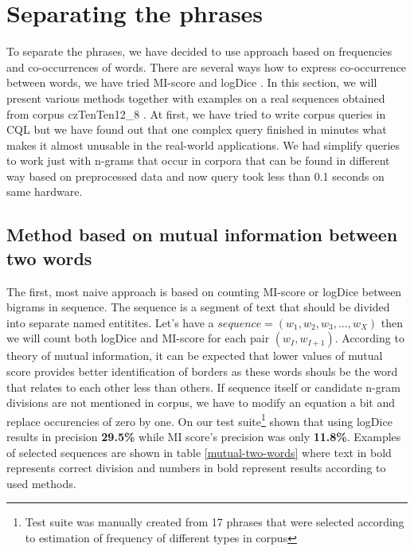 \documentclass[runningheads]{llncs}
\begin{document}
\section{Separating the phrases}

To separate the phrases, we have decided to use approach based on
frequencies and co-occurrences of words.  There are several ways how to
express co-occurrence between words, we have tried MI-score
\cite{church1990word} and logDice \cite{rychly2008lexicographer}.  In this
section, we will present various methods together with examples on a real
sequences obtained from corpus czTenTen12\_8 \cite{jakubivcek2013tenten}. 
At first, we have tried to write corpus queries in CQL \cite{arasu2004cql}
but we have found out that one complex query finished in minutes what makes
it almost unusable in the real-world applications.  We had simplify queries
to work just with n-grams that occur in corpora that can be found in
different way based on preprocessed data and now query took less than 0.1
seconds on same hardware.

\subsection{Method based on mutual information between two words}

The first, most naive approach is based on counting MI-score or
logDice between bigrams in sequence. The sequence is a segment of text that
should be divided into separate named entitites. Let's have a ${sequence} = (w_1,
w_2, w_3, ..., w_X)$ then we will count both logDice and MI-score for each
pair $(w_I, w_{I+1})$. According to theory of mutual information, it can be
expected that lower values of mutual score provides better identification of
borders as these words shouls be the word that relates to each other less
than others. If sequence itself or candidate n-gram divisions are not
mentioned in corpus, we have to modify an equation a bit and replace
occurencies of zero by one. On our test suite\footnote{Test suite was
manually created from 17 phrases that were selected according to estimation
of frequency of different types in corpus} shown that using logDice results
in precision {\bf 29.5\%} while MI score's precision was only {\bf 11.8\%}.
Examples of selected sequences are shown in table \ref{mutual-two-words}
where text in bold represents correct division and numbers in bold
represent results according to used methods.
\end{document}
